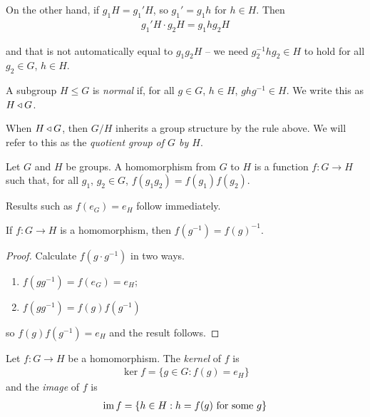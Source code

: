 \documentclass{../template/note}
\begin{document}
    On the other hand, if $g_1H = g_1'H$, so $g_1' = g_1h$ for $h \in H$. Then
    \begin{align*}
        g_1'H \cdot g_2H = g_1hg_2H
    \end{align*}
    
    and that is not automatically equal to $g_1g_2H$ -- we need $g_2^{-1}hg_2 \in H$ to hold for all $g_2 \in G$, $h \in H$.

    \begin{definition}
        A subgroup $H \leq G$ is \emph{normal} if, for all $g \in G$, $h \in H$, $ghg^{-1} \in H$. We write this as $H \triangleleft G$.
    \end{definition}
    
    \begin{remark}
        When $H \triangleleft G$, then $G/H$ inherits a group structure by the rule above. We will refer to this as the \emph{quotient group of $G$ by $H$}.
    \end{remark}
    
    \begin{definition}[Homomorphisms]
        Let $G$ and $H$ be groups. A homomorphism from $G$ to $H$ is a function $f: G \to H$ such that, for all $g_1$, $g_2 \in G$, $f(g_1 g_2) = f(g_1) f(g_2)$.
    \end{definition}
    
    Results such as $f(e_G) = e_H$ follow immediately.
    
    \begin{lemma}
        If $f: G \to H$ is a homomorphism, then $f(g^{-1}) = f(g)^{-1}$.
    \end{lemma}
    
    \begin{proof}
        Calculate $f(g \cdot g^{-1})$ in two ways.
        \begin{enumerate}[label=\protect\circled{\arabic*}]
            \item $f(gg^{-1}) = f(e_G) = e_H$;
            \item $f(gg^{-1}) = f(g) f(g^{-1})$
        \end{enumerate}
        so $f(g) f(g^{-1}) = e_H$ and the result follows.        
    \end{proof}
    
    \begin{definition}
        Let $f: G \to H$ be a homomorphism. The \emph{kernel} of $f$ is
        \begin{align*}
            \ker f = \{g \in G : f(g) = e_H\}
        \end{align*}
        and the \emph{image} of $f$ is
        \begin{align*}
            \operatorname{im} f = \{h \in H: h = f(g) \text{ for some } g\}
        \end{align*}     
    \end{definition}
    
\end{document}
